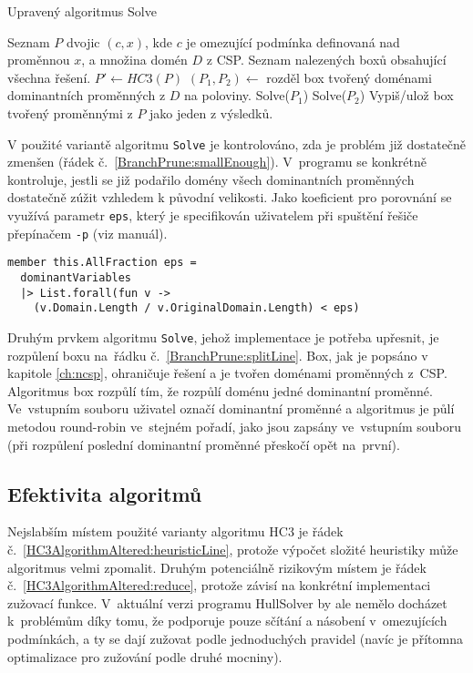 \begin{algorithm}
\caption{Upravený algoritmus Solve}
\label{BranchPrune}
\begin{algorithmic}[1]
\Require Seznam $P$ dvojic $(c, x)$, kde $c$ je omezující podmínka definovaná nad proměnnou $x$, a množina domén $D$ z CSP.
\Ensure Seznam nalezených boxů obsahující všechna řešení.
 \label{BranchPrune:smallEnough}
\State $P' \gets HC3(P)$
\State $(P_1, P_2) \gets $ rozděl box tvořený doménami dominantních proměnných z $D$ na poloviny. \label{BranchPrune:splitLine}
\State Solve($P_1$)
\State Solve($P_2$)
\Else
\State Vypiš/ulož box tvořený proměnnými z $P$ jako jeden z výsledků.
\EndIf
\EndProcedure
\end{algorithmic}
\end{algorithm}

V použité variantě algoritmu \verb|Solve| je kontrolováno, zda je problém již dostatečně zmenšen (řádek č.~\ref{BranchPrune:smallEnough}). V~programu se konkrétně kontroluje, jestli se již podařilo domény všech dominantních proměnných dostatečně zúžit vzhledem k původní velikosti. Jako koeficient pro porovnání se využívá parametr \verb|eps|, který je specifikován uživatelem při spuštění řešiče přepínačem \verb|-p| (viz manuál).

\begin{Verbatim}[samepage=true]
member this.AllFraction eps =
  dominantVariables 
  |> List.forall(fun v -> 
    (v.Domain.Length / v.OriginalDomain.Length) < eps)
\end{Verbatim}


Druhým prvkem algoritmu \verb|Solve|, jehož implementace je potřeba upřesnit, je rozpůlení boxu na~řádku č.~\ref{BranchPrune:splitLine}. Box, jak je popsáno v kapitole \ref{ch:ncsp}, ohraničuje řešení a je tvořen doménami proměnných z~CSP. Algoritmus box rozpůlí tím, že rozpůlí doménu jedné dominantní proměnné. Ve~vstupním souboru uživatel označí dominantní proměnné a algoritmus je půlí metodou round-robin ve~stejném pořadí, jako jsou zapsány ve~vstupním souboru (při rozpůlení poslední dominantní proměnné přeskočí opět na~první).


\subsection{Efektivita algoritmů}
Nejslabším místem použité varianty algoritmu HC3 je řádek č.~\ref{HC3AlgorithmAltered:heuristicLine}, protože výpočet složité heuristiky může algoritmus velmi zpomalit. Druhým potenciálně rizikovým místem je řádek č.~\ref{HC3AlgorithmAltered:reduce}, protože závisí na konkrétní implementaci zužovací funkce. V~aktuální verzi programu HullSolver by ale nemělo docházet k~problémům díky tomu, že podporuje pouze sčítání a násobení v~omezujících podmínkách, a ty se dají zužovat podle jednoduchých pravidel (navíc je přítomna optimalizace pro zužování podle druhé mocniny).

